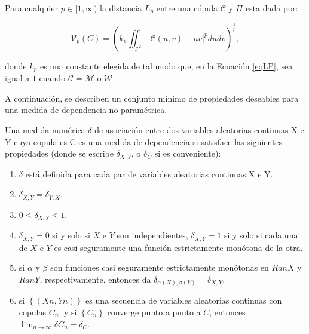 \begin{defn}\label{lp}
    Para cualquier $p \in[1, \infty)$ la distancia $L_p$ entre una cópula $\mathcal{C}$ y $\Pi$ esta dada por:

    \begin{equation}\label{eqLP}
        \mathcal{V}_p(C)=\left(k_p \iint_{\mathcal{I}^2}|\mathcal{C}(u, v)-u v|^p d u d v\right)^{\frac{1}{p}},
    \end{equation}

    donde $k_p$ es una constante elegida de tal modo que, en la Ecuación \eqref{eqLP}, sea igual a $1$ cuando $\mathcal{C}=\mathcal{M}$ o $\mathcal{W}$.
\end{defn}


A continuación, se describen un conjunto mínimo de propiedades deseables para una medida de dependencia no paramétrica. 

\begin{defn}
    Una medida numérica $\delta$ de asociación entre dos variables aleatorias continuas X e Y cuya copula es C es una medida de dependencia si satisface las siguientes propiedades (donde se escribe $\delta_{X,Y}$, o $\delta_C$ si es conveniente):

    \begin{enumerate}
        \item $\delta$ está definida para cada par de variables aleatorias continuas X e Y.
        \item $\delta_{X,Y} = \delta_{Y,X}$.
        \item $0 \leq \delta_ {X,Y} \leq 1$.
        \item  $\delta_{X,Y} = 0$ si y solo si $X$ e $Y$ son independientes, $\delta_{X,Y} = 1$ si y solo si cada una de $X$ e $Y$ es casi seguramente una función estrictamente monótona de la otra.
        \item si $\alpha$ y $\beta$ son funciones casi seguramente estrictamente monótonas en $RanX$ y $RanY$, respectivamente, entonces da $\delta_{\alpha(X), \beta(Y)} = \delta_{X,Y}$.
        \item si $\left\{ ( Xn ,Yn )\right\}$ es una secuencia de variables aleatorias continuas con copulas $C_n$, y si $\left\{ C_n\right\}$ converge punto a punto a $C$, entonces $\lim_{n \to \infty} \delta C_n = \delta_C$.
    \end{enumerate}
\end{defn}

